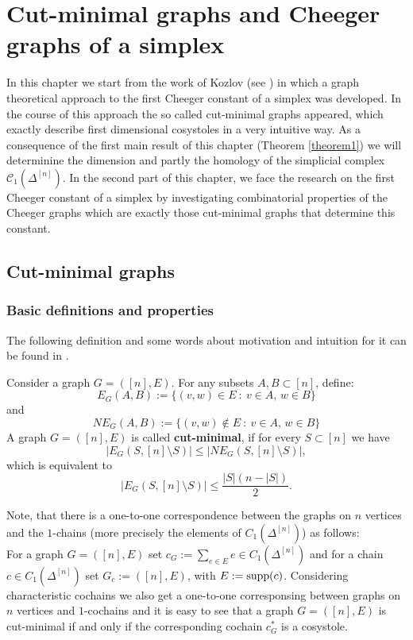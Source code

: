 
\chapter{Cut-minimal graphs and Cheeger graphs of a simplex}

\label{Chapter3}

In this chapter we start from the work of Kozlov (see \cite{1}) in which a graph theoretical approach to the first Cheeger constant of a simplex was developed. In the course of this approach the so called cut-minimal graphs appeared, which exactly describe first dimensional cosystoles in a very intuitive way. As a consequence of the first main result of this chapter (Theorem \ref{theorem1}) we will determinine the dimension and partly the homology of the simplicial complex \(\mathcal{C}_1(\Delta^{[n]})\). In the second part of this chapter, we face the research on the first Cheeger constant of a simplex by investigating combinatorial properties of the Cheeger graphs which are exactly those cut-minimal graphs that determine this constant.

\section{Cut-minimal graphs}


\subsection{Basic definitions and properties}
The following definition and some words about motivation and intuition for it can be found in \cite{1}.

\begin{defi}
Consider a graph \(G=([n],E)\). For any subsets \(A,B\subset [n]\), define:
\[
E_G(A,B):=\{(v,w)\in E\: :\: v\in A\text{, }w\in B\}
\]
and
\[
NE_G(A,B):=\{(v,w)\notin E\: :\: v\in A\text{, }w\in B\}
\]
A graph \(G=([n],E)\) is called \textbf{cut-minimal}, if for every \(S\subset[n]\) we have
\[
|E_G(S,[n]\setminus S)|\leq |NE_G(S,[n]\setminus S)|,
\]
which is equivalent to
\[
|E_G(S,[n]\setminus S)|\leq\frac{|S|(n-|S|)}{2}.
\]
\end{defi}

Note, that there is a one-to-one correspondence between the graphs on \(n\) vertices and the \(1\)-chains (more precisely the elements of \(C_1(\Delta^{[n]})\)) as follows:\\
For a graph \(G=([n],E)\) set \(c_G:=\sum\limits_{e\in E}e\in C_1(\Delta^{[n]})\) and for a chain \(c\in C_1(\Delta^{[n]})\) set \(G_c:=([n],E)\), with \(E:=\mathrm{supp}(c)\). Considering characteristic cochains we also get a one-to-one corresponsing between graphs on \(n\) vertices and \(1\)-cochains and it is easy to see that a graph \(G=([n],E)\) is cut-minimal if and only if the corresponding cochain \(c_G^*\) is a cosystole.

